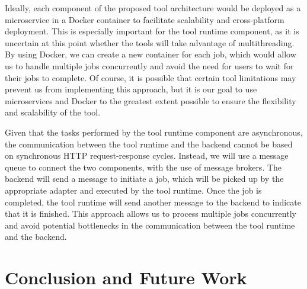 \documentclass[conference]{IEEEtran}
\begin{document}
Ideally, each component of the proposed tool architecture would be deployed as
a microservice in a Docker container to facilitate scalability and
cross-platform deployment. This is especially important for the tool runtime
component, as it is uncertain at this point whether the tools will take
advantage of multithreading. By using Docker, we can create a new container for
each job, which would allow us to handle multiple jobs concurrently and avoid
the need for users to wait for their jobs to complete. Of course, it is
possible that certain tool limitations may prevent us from implementing this
approach, but it is our goal to use microservices and Docker to the greatest
extent possible to ensure the flexibility and scalability of the tool.

Given that the tasks performed by the tool runtime component are asynchronous,
the communication between the tool runtime and the backend cannot be based on
synchronous HTTP request-response cycles. Instead, we will use a message queue
to connect the two components, with the use of message brokers. The backend
will send a message to initiate a job, which will be picked up by the
appropriate adapter and executed by the tool runtime. Once the job is
completed, the tool runtime will send another message to the backend to
indicate that it is finished. This approach allows us to process multiple jobs
concurrently and avoid potential bottlenecks in the communication between the
tool runtime and the backend.

\section{Conclusion and Future Work}




\end{document}
